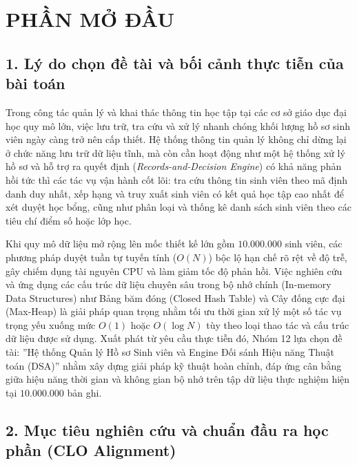 \documentclass[14pt,a4paper]{extarticle}
\begin{document}
\section*{PHẦN MỞ ĐẦU}
{}

\subsection*{1. Lý do chọn đề tài và bối cảnh thực tiễn của bài toán}
{}

Trong công tác quản lý và khai thác thông tin học tập tại các cơ sở giáo dục đại học quy mô lớn, việc lưu trữ, tra cứu và xử lý nhanh chóng khối lượng hồ sơ sinh viên ngày càng trở nên cấp thiết. Hệ thống thông tin quản lý không chỉ dừng lại ở chức năng lưu trữ dữ liệu tĩnh, mà còn cần hoạt động như một hệ thống xử lý hồ sơ và hỗ trợ ra quyết định (\textit{Records-and-Decision Engine}) có khả năng phản hồi tức thì các tác vụ vận hành cốt lõi: tra cứu thông tin sinh viên theo mã định danh duy nhất, xếp hạng và truy xuất sinh viên có kết quả học tập cao nhất để xét duyệt học bổng, cũng như phân loại và thống kê danh sách sinh viên theo các tiêu chí điểm số hoặc lớp học.

Khi quy mô dữ liệu mở rộng lên mốc thiết kế lớn gồm $10.000.000$ sinh viên, các phương pháp duyệt tuần tự tuyến tính ($O(N)$) bộc lộ hạn chế rõ rệt về độ trễ, gây chiếm dụng tài nguyên CPU và làm giảm tốc độ phản hồi. Việc nghiên cứu và ứng dụng các cấu trúc dữ liệu chuyên sâu trong bộ nhớ chính (In-memory Data Structures) như Bảng băm đóng (Closed Hash Table) và Cây đống cực đại (Max-Heap) là giải pháp quan trọng nhằm tối ưu thời gian xử lý một số tác vụ trọng yếu xuống mức $O(1)$ hoặc $O(\log N)$ tùy theo loại thao tác và cấu trúc dữ liệu được sử dụng. Xuất phát từ yêu cầu thực tiễn đó, Nhóm 12 lựa chọn đề tài: ''Hệ thống Quản lý Hồ sơ Sinh viên và Engine Đối sánh Hiệu năng Thuật toán (DSA)'' nhằm xây dựng giải pháp kỹ thuật hoàn chỉnh, đáp ứng cân bằng giữa hiệu năng thời gian và không gian bộ nhớ trên tập dữ liệu thực nghiệm hiện tại $10.000.000$ bản ghi.

\subsection*{2. Mục tiêu nghiên cứu và chuẩn đầu ra học phần (CLO Alignment)}
{}
\end{document}
